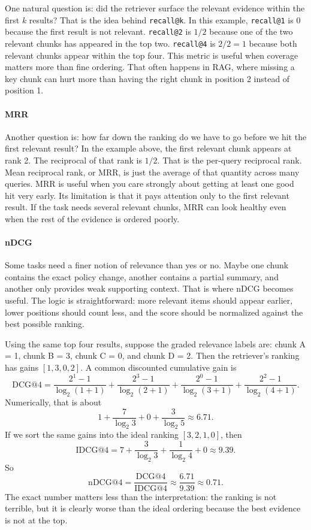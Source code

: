 \documentclass[12pt]{article}
\begin{document}
One natural question is: did the retriever surface the relevant evidence
within the first $k$ results? That is the idea behind
\texttt{recall@k}. In this example, \texttt{recall@1} is 0 because the
first result is not relevant. \texttt{recall@2} is $1/2$ because one of
the two relevant chunks has appeared in the top two. \texttt{recall@4} is
$2/2 = 1$ because both relevant chunks appear within the top four.
This metric is useful when coverage matters more than fine ordering. That
often happens in RAG, where missing a key chunk can hurt more than having
the right chunk in position 2 instead of position 1.

\paragraph{MRR}

Another question is: how far down the ranking do we have to go before we
hit the first relevant result? In the example above, the first relevant
chunk appears at rank 2. The reciprocal of that rank is $1/2$. That is
the per-query reciprocal rank. Mean reciprocal rank, or MRR, is just the
average of that quantity across many queries. MRR is useful when you care
strongly about getting at least one good hit very early. Its limitation is
that it pays attention only to the first relevant result. If the task
needs several relevant chunks, MRR can look healthy even when the rest of
the evidence is ordered poorly.

\paragraph{nDCG}

Some tasks need a finer notion of relevance than yes or no. Maybe one
chunk contains the exact policy change, another contains a partial
summary, and another only provides weak supporting context. That is where
nDCG becomes useful. The logic is straightforward: more relevant items
should appear earlier, lower positions should count less, and the score
should be normalized against the best possible ranking.

Using the same top four results, suppose the graded relevance labels are:
chunk A = 1, chunk B = 3, chunk C = 0, and chunk D = 2. Then the
retriever's ranking has gains $[1,3,0,2]$. A common discounted cumulative
gain is
\[
\mathrm{DCG}@4 =
\frac{2^1-1}{\log_2(1+1)} +
\frac{2^3-1}{\log_2(2+1)} +
\frac{2^0-1}{\log_2(3+1)} +
\frac{2^2-1}{\log_2(4+1)}.
\]
Numerically, that is about
\[
1 + \frac{7}{\log_2 3} + 0 + \frac{3}{\log_2 5} \approx 6.71.
\]
If we sort the same gains into the ideal ranking $[3,2,1,0]$, then
\[
\mathrm{IDCG}@4 =
7 + \frac{3}{\log_2 3} + \frac{1}{\log_2 4} + 0 \approx 9.39.
\]
So
\[
\mathrm{nDCG}@4 = \frac{\mathrm{DCG}@4}{\mathrm{IDCG}@4}
\approx \frac{6.71}{9.39} \approx 0.71.
\]
The exact number matters less than the interpretation: the ranking is not
terrible, but it is clearly worse than the ideal ordering because the
best evidence is not at the top.
\end{document}
